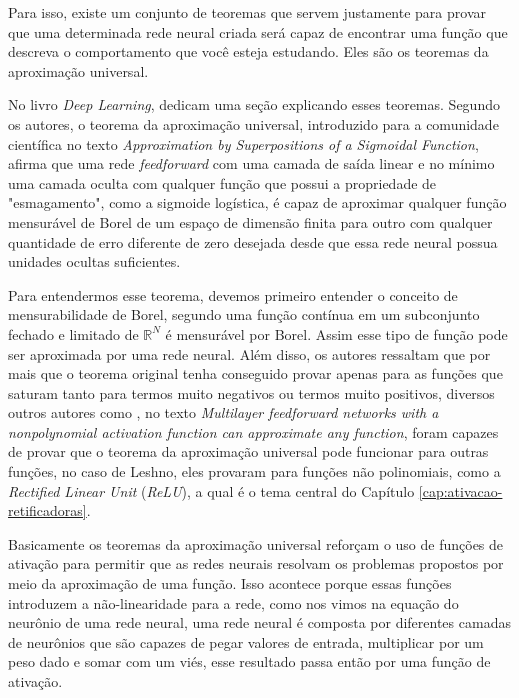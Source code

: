 Para isso, existe um conjunto de teoremas que servem justamente para provar que uma determinada rede neural criada será capaz de encontrar uma função que descreva o comportamento que você esteja estudando. Eles são os teoremas da aproximação universal.

No livro \textit{Deep Learning}, \textcite{DeepLearningBook} dedicam uma seção explicando esses teoremas. Segundo os autores, o teorema da aproximação universal, introduzido \textcite{Cybenko1989} para a comunidade científica no texto \textit{Approximation by Superpositions of a Sigmoidal Function}, afirma que uma rede \textit{feedforward} com uma camada de saída linear e no mínimo uma camada oculta com qualquer função que possui a propriedade de "esmagamento", como a sigmoide logística, é capaz de aproximar qualquer função mensurável de Borel de um espaço de dimensão finita para outro com qualquer quantidade de erro diferente de zero desejada desde que essa rede neural possua unidades ocultas suficientes.

Para entendermos esse teorema, devemos primeiro entender o conceito de mensurabilidade de Borel, segundo \textcite{DeepLearningBook} uma função contínua em um subconjunto fechado e limitado de $\mathbb{R}^N$ é mensurável por Borel. Assim esse tipo de função pode ser aproximada por uma rede neural. Além disso, os autores ressaltam que por mais que o teorema original tenha conseguido provar apenas para as funções que saturam tanto para termos muito negativos ou termos muito positivos, diversos outros autores como \textcite{Leshno1993}, no texto \textit{Multilayer feedforward networks with a nonpolynomial activation function can approximate any function}, foram capazes de provar que o teorema da aproximação universal pode funcionar para outras funções, no caso de Leshno, eles provaram para funções não polinomiais, como a \textit{Rectified Linear Unit} (\textit{ReLU}), a qual é o tema central do Capítulo \ref{cap:ativacao-retificadoras}.

Basicamente os teoremas da aproximação universal reforçam o uso de funções de ativação para permitir que as redes neurais resolvam os problemas propostos por meio da aproximação de uma função. Isso acontece porque essas funções introduzem a não-linearidade para a rede, como nos vimos na equação do neurônio de uma rede neural, uma rede neural é composta por diferentes camadas de neurônios que são capazes de pegar valores de entrada, multiplicar por um peso dado e somar com um viés, esse resultado passa então por uma função de ativação.

